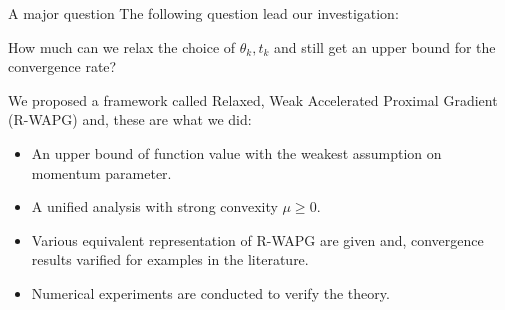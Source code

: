 \documentclass[11pt]{beamer}
\theoremstyle{definition}
\begin{document}
    \begin{frame}{A major question}
        The following question lead our investigation: 
        \begin{tcolorbox}
            How much can we relax the choice of $\theta_k, t_k$ and still get an upper bound for the convergence rate? 
        \end{tcolorbox}
        We proposed a framework called Relaxed, Weak Accelerated Proximal Gradient (R-WAPG) and, these are what we did: 
        \begin{itemize}
            \item An upper bound of function value with the weakest assumption on momentum parameter.
            \item A unified analysis with strong convexity $\mu \ge 0$. 
            \item Various equivalent representation of R-WAPG are given and, convergence results varified for examples in the literature. 
            \item Numerical experiments are conducted to verify the theory. 
        \end{itemize}
    \end{frame}
\end{document}
